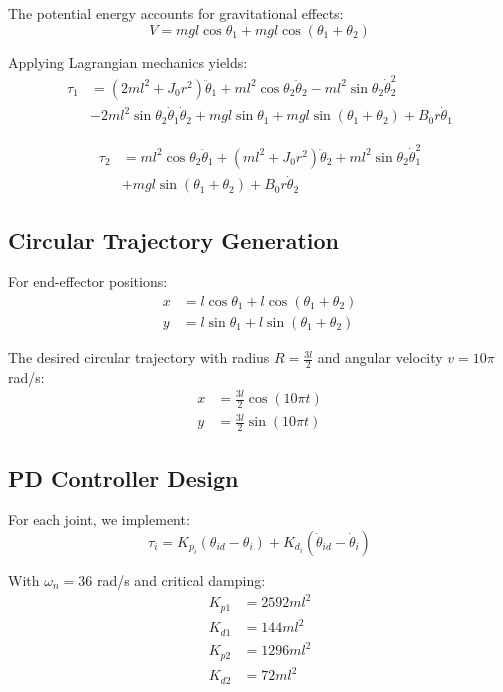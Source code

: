 \documentclass{article}
\begin{document}
The potential energy accounts for gravitational effects:
\[
V = mgl\cos\theta_1 + mgl\cos(\theta_1 + \theta_2)
\]

Applying Lagrangian mechanics yields:
\begin{align}
\tau_1 &= (2ml^2 + J_0 r^2)\ddot{\theta}_1 + ml^2 \cos\theta_2 \ddot{\theta}_2 - ml^2 \sin\theta_2 \dot{\theta}_2^2 \\
&- 2ml^2 \sin\theta_2 \dot{\theta}_1 \dot{\theta}_2 + mgl\sin\theta_1 + mgl\sin(\theta_1 + \theta_2) + B_0 r \dot{\theta}_1
\end{align}

\begin{align}
\tau_2 &= ml^2 \cos\theta_2 \ddot{\theta}_1 + (ml^2 + J_0 r^2)\ddot{\theta}_2 + ml^2 \sin\theta_2 \dot{\theta}_1^2 \\
&+ mgl\sin(\theta_1 + \theta_2) + B_0 r \dot{\theta}_2
\end{align}

\subsection*{Circular Trajectory Generation}

For end-effector positions:
\begin{align}
x &= l\cos\theta_1 + l\cos(\theta_1 + \theta_2) \\
y &= l\sin\theta_1 + l\sin(\theta_1 + \theta_2)
\end{align}

The desired circular trajectory with radius $R = \frac{3l}{2}$ and angular velocity $v = 10\pi$ rad/s:
\begin{align}
x &= \frac{3l}{2}\cos(10\pi t) \\
y &= \frac{3l}{2}\sin(10\pi t)
\end{align}

\subsection*{PD Controller Design}

For each joint, we implement:
\[
\tau_i = K_{p_i} (\theta_{id} - \theta_i) + K_{d_i} (\dot{\theta}_{id} - \dot{\theta}_i)
\]

With $\omega_n = 36$ rad/s and critical damping:
\begin{align}
K_{p1} &= 2592 ml^2 \\
K_{d1} &= 144 ml^2 \\
K_{p2} &= 1296 ml^2 \\
K_{d2} &= 72 ml^2
\end{align}
\end{document}
